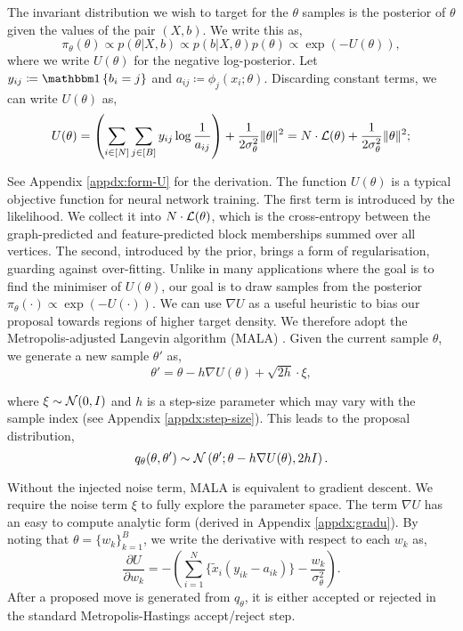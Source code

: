 The invariant distribution we wish to target for the $\theta$ samples is the posterior of $\theta$ given the values of the pair $(X, b)$. 
We write this as,
%
\begin{equation}
	\pi_\theta(\theta) \propto p(\theta | X, b) \propto p(b | X, \theta) p(\theta) \propto  \exp \left( - U(\theta) \right),
	\label{eq:U}
\end{equation}
%
where we write $U(\theta)$ for the negative log-posterior. Let $y_{ij} \coloneqq \one \left\{ b_i = j \right\}$ and $a_{ij} \coloneqq \phi_j(x_i; \theta)$. 
Discarding constant terms, we can write $U(\theta)$ as,
%
\begin{equation}
	U(\theta) = \left( \sum_{i \in [N]} \sum_{j \in [B]} y_{ij} \log \frac{1}{a_{ij}} \right)
	+ \frac{1}{2\sigma_\theta^2} \|\theta\|^2 = N \cdot \mathcal{L}(\theta) + \frac{1}{2\sigma_\theta^2} \|\theta\|^2;
	\label{eqn:U-form}
\end{equation}

See Appendix \ref{appdx:form-U} for the derivation. The function $U(\theta)$ is a typical objective function for neural network training. The first term is introduced by the likelihood. We collect it into $N \cdot \mathcal{L}(\theta)$, which is the cross-entropy between the graph-predicted and feature-predicted block memberships summed over all vertices. 
The second, introduced by the prior, brings a form of regularisation, guarding against over-fitting. Unlike in many applications where the goal 
is to find the minimiser of $U(\theta)$, our goal is to draw samples from the posterior $\pi_\theta(\cdot) \propto \exp(-U(\cdot))$. We can use $\nabla U$ as a useful heuristic to bias our proposal towards regions of higher target density. We therefore adopt the Metropolis-adjusted Langevin algorithm (MALA) \cite{mala-tweedie}. Given the current sample $\theta$, we generate 
a new sample $\theta'$ as,
\begin{equation*}
	\theta' = \theta - h \nabla U(\theta) + \sqrt{2h} \cdot \xi,
\end{equation*}

where $\xi \sim \mathcal{N}(0, I)$ and $h$ is a step-size parameter 
which may vary with the sample index (see Appendix \ref{appdx:step-size}).
This leads to the proposal distribution,
\begin{equation*}
	q_\theta(\theta, \theta') \sim \mathcal{N} \left( \theta' ; \theta - h \nabla U(\theta), 2h I \right).
\end{equation*}

Without the injected noise term, MALA is equivalent to gradient descent. We require the noise term $\xi$ to fully explore the parameter space. 
The term $\nabla U$ has an easy to compute analytic form (derived in Appendix \ref{appdx:gradu}). By noting that $\theta = \{w_k\}_{k=1}^{B}$, we write the derivative with respect to each $w_k$ as,
%
\begin{equation}
	\frac{\partial U}{\partial w_k} = - \left( \sum_{i=1}^{N} \Big\{ \tilde{x}_i (y_{ik} - a_{ik}) \Big\} - \frac{w_k}{\sigma_\theta^2} \right).
	\label{eqn:U-derivative}
\end{equation}
%
After a proposed move is generated from $q_\theta$,
it is either accepted or rejected in the standard
Metropolis-Hastings accept/reject step.


